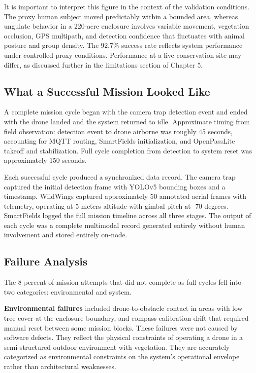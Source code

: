 It is important to interpret this figure in the context of the validation conditions. The proxy human subject moved predictably within a bounded area, whereas ungulate behavior in a 220-acre enclosure involves variable movement, vegetation occlusion, GPS multipath, and detection confidence that fluctuates with animal posture and group density. The 92.7\% success rate reflects system performance under controlled proxy conditions. Performance at a live conservation site may differ, as discussed further in the limitations section of Chapter 5.

\subsection{What a Successful Mission Looked Like}
\label{subsec:ch4_p2_applied}
A complete mission cycle began with the camera trap detection event and ended with the drone landed and the system returned to idle. Approximate timing from field observation: detection event to drone airborne was roughly 45 seconds, accounting for MQTT routing, SmartFields initialization, and OpenPassLite takeoff and stabilization. Full cycle completion from detection to system reset was approximately 150 seconds.

Each successful cycle produced a synchronized data record. The camera trap captured the initial detection frame with YOLOv5 bounding boxes and a timestamp. WildWings captured approximately 50 annotated aerial frames with telemetry, operating at 5 meters altitude with gimbal pitch at -70 degrees. SmartFields logged the full mission timeline across all three stages. The output of each cycle was a complete multimodal record generated entirely without human involvement and stored entirely on-node.

\subsection{Failure Analysis}
\label{subsec:ch4_p3_applied}
The 8 percent of mission attempts that did not complete as full cycles fell into two categories: environmental and system.

\textbf{Environmental failures} included drone-to-obstacle contact in areas with low tree cover at the enclosure boundary, and compass calibration drift that required manual reset between some mission blocks. These failures were not caused by software defects. They reflect the physical constraints of operating a drone in a semi-structured outdoor environment with vegetation. They are accurately categorized as environmental constraints on the system's operational envelope rather than architectural weaknesses.

